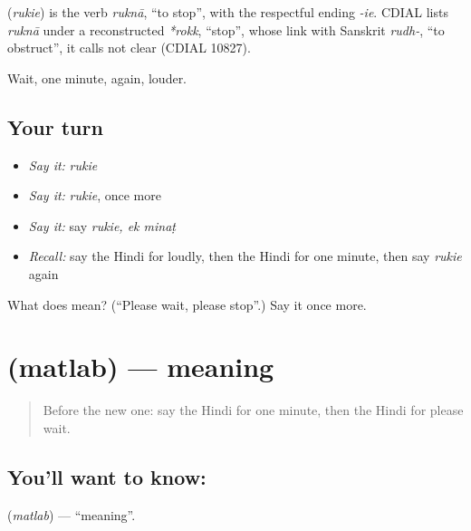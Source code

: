 \begin{cousinweb}
\textbf{} (\emph{rukie}) is the verb \emph{ruknā}, \textquotedblleft{}to stop\textquotedblright{}, with the respectful ending \emph{-ie}. CDIAL lists \emph{ruknā} under a reconstructed \emph{*rokk}, \textquotedblleft{}stop\textquotedblright{}, whose link with Sanskrit \emph{rudh-}, \textquotedblleft{}to obstruct\textquotedblright{}, it calls not clear (CDIAL 10827).
\end{cousinweb}

\begin{grammarlens}[title={What you've built}]
Wait, one minute, again, louder.
\end{grammarlens}

\subsection*{Your turn}
\begin{itemize}
\raggedright
  \item \emph{Say it:} \emph{rukie}
  \item \emph{Say it:} \emph{rukie}, once more
  \item \emph{Say it:} say \emph{rukie, ek minaṭ}
  \item \emph{Recall:} say the Hindi for loudly, then the Hindi for one minute, then say \emph{rukie} again
\end{itemize}

\begin{tcolorbox}[breakable,colback=teal!4,colframe=teal!35!black,title={Before you move on}]
What does  mean? (\textquotedblleft{}Please wait, please stop\textquotedblright{}.) Say it once more.
\end{tcolorbox}
\section[\texorpdfstring{\hi{मतलब} (matlab)}{मतलब (matlab)}]{ (matlab) — meaning}

\label{lesson:HI-C110-matlab}



\begin{quote}
Before the new one: say the Hindi for one minute, then the Hindi for please wait.
\end{quote}

\subsection*{You'll want to know: }
\textbf{} (\emph{matlab}) — \textquotedblleft{}meaning\textquotedblright{}.

